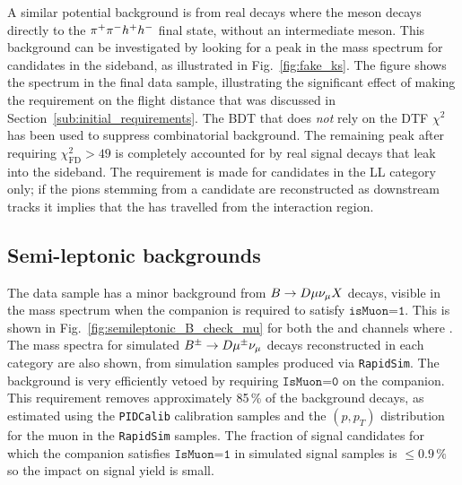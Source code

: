 A similar potential background is from real \BtoDh decays where the \D meson decays directly to the ${{\pi}^+}{{\pi}^-} h^+ h^-$ final state, without an intermediate \KS meson. This background can be investigated by looking for a peak in the \B mass spectrum for candidates in the \KS sideband, as illustrated in Fig.~\ref{fig:fake_ks}. The figure shows the spectrum in the final data sample, illustrating the significant effect of making the requirement on the \KS flight distance that was discussed in Section~\ref{sub:initial_requirements}. The BDT that does \emph{not} rely on the DTF $\chi^2$ has been used to suppress combinatorial background. The remaining peak after requiring $\chi^2_\text{FD}>49$ is completely accounted for by real signal decays that leak into the \KS sideband. The requirement is made for candidates in the LL category only; if the pions stemming from a \KS candidate are reconstructed as downstream tracks it implies that the \KS has travelled from the interaction region.


\subsection{Semi-leptonic backgrounds} %
\label{sub:semi_leptonic_backgrounds}



The data sample has a minor background from ${B}\rightarrow{\ensuremath{D}}\mu\nu_\mu X$ decays, visible in the \B mass spectrum when the companion is required to satisfy $\texttt{isMuon=1}$.  This is shown in Fig.~\ref{fig:semileptonic_B_check_mu} for both the \BtoDK and \BtoDpi channels where \DtoKspipi. The \B mass spectra for simulated ${{B}^\pm}\rightarrow{\ensuremath{D}}{\ensuremath{\mu^\pm}}\nu_\mu$ decays reconstructed in each category are also shown, from simulation samples produced via \texttt{RapidSim}. The background is very efficiently vetoed by requiring $\texttt{IsMuon=0}$ on the companion. This requirement removes approximately 85\,\% of the background decays, as estimated using the \texttt{PIDCalib} calibration samples and the $(p, p_T)$ distribution for the muon in the \texttt{RapidSim} samples. The fraction of signal candidates for which the companion satisfies $\texttt{IsMuon=1}$ in simulated signal samples is $\leq 0.9\,\%$ so the impact on signal yield is small.

